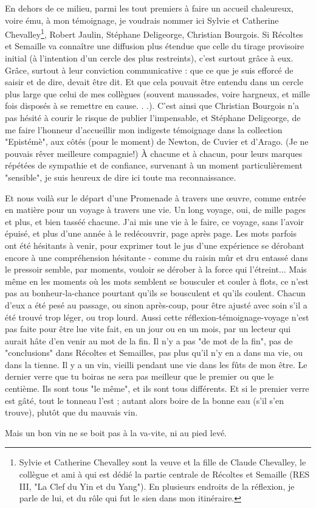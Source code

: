En dehors de ce milieu, parmi les tout premiers à faire un accueil chaleureux, voire ému, à mon témoignage, je voudrais nommer ici Sylvie et Catherine Chevalley\footnote{Sylvie et Catherine Chevalley sont la veuve et la fille de Claude Chevalley, le collègue et ami à qui est dédié la partie centrale de Récoltes et Semaille (RES III, "La Clef du Yin et du Yang"). En plusieurs endroits de la réflexion, je parle de lui, et du rôle qui fut le sien dans mon itinéraire.}, Robert Jaulin, Stéphane Deligeorge, Christian Bourgois. Si Récoltes et Semaille va connaître une diffusion plus étendue que celle du tirage provisoire initial (à l’intention d’un cercle des plus restreints), c’est surtout grâce à eux. Grâce, surtout à leur conviction communicative : que ce que je suis efforcé de saisir et de dire, devait être dit. Et que cela pouvait être entendu dans un cercle plus large que celui de mes collègues (souvent maussades, voire hargneux, et mille fois disposés à se remettre en cause. . .). C’est ainsi que Christian Bourgois n’a pas hésité à courir le risque de publier l’impensable, et Stéphane Deligeorge, de me faire l’honneur d’accueillir mon indigeste témoignage dans la collection "Epistémè", aux côtés (pour le moment) de Newton, de Cuvier et d’Arago. (Je ne pouvais rêver meilleure compagnie!) À chacune et à chacun, pour leurs marques répétées de sympathie et de confiance, survenant à un moment particulièrement "sensible", je suis heureux de dire ici toute ma reconnaissance.

Et nous voilà sur le départ d’une Promenade à travers une œuvre, comme entrée en matière pour un voyage à travers une vie. Un long voyage, oui, de mille pages et plus, et bien tasséé chacune. J’ai mis une vie à le faire, ce voyage, sans l’avoir épuisé, et plus d’une année à le redécouvrir, page après page. Les mots parfois ont été hésitants à venir, pour exprimer tout le jus d’une expérience se dérobant encore à une compréhension hésitante - comme du raisin mûr et dru entassé dans le pressoir semble, par moments, vouloir se dérober à la force qui l’étreint... Mais même en les moments où les mots semblent se bousculer et couler à flots, ce n’est pas au bonheur-la-chance pourtant qu’ils se bousculent et qu’ils coulent. Chacun d’eux a été pesé au passage, ou sinon après-coup, pour être ajusté avec soin s’il a été trouvé trop léger, ou trop lourd. Aussi cette réflexion-témoignage-voyage n’est pas faite pour être lue vite fait, en un jour ou en un mois, par un lecteur qui aurait hâte d’en venir au mot de la fin. Il n’y a pas "de mot de la fin", pas de "conclusions" dans Récoltes et Semailles, pas plus qu’il n’y en a dans ma vie, ou dans la tienne. Il y a un vin, vieilli pendant une vie dans les fûts de mon être. Le dernier verre que tu boiras ne sera pas meilleur que le premier ou que le centième. Ils sont tous "le même", et ils sont tous différents. Et si le premier verre est gâté, tout le tonneau l’est ; autant alors boire de la bonne eau (s’il s’en trouve), plutôt que du mauvais vin.

Mais un bon vin ne se boit pas à la va-vite, ni au pied levé.








